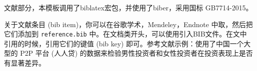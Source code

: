 文献部分，本模板调用了biblatex宏包，并使用了biber，采用国标 GB7714-2015。

关于文献条目 (bib item)，你可以在谷歌学术，Mendeley，Endnote 中取，然后把它们添加到 \texttt{reference.bib} 中。在文档类开头，可以使用\texttt{}引入BIB文件。在文中引用的时候，引用它们的键值 (bib key) 即可。参考文献示例：\cite{cn1,en2,en3}使用了中国一个大型的 P2P 平台 (人人贷) 的数据来检验男性投资者和女性投资者在投资表现上是否有显著差异。